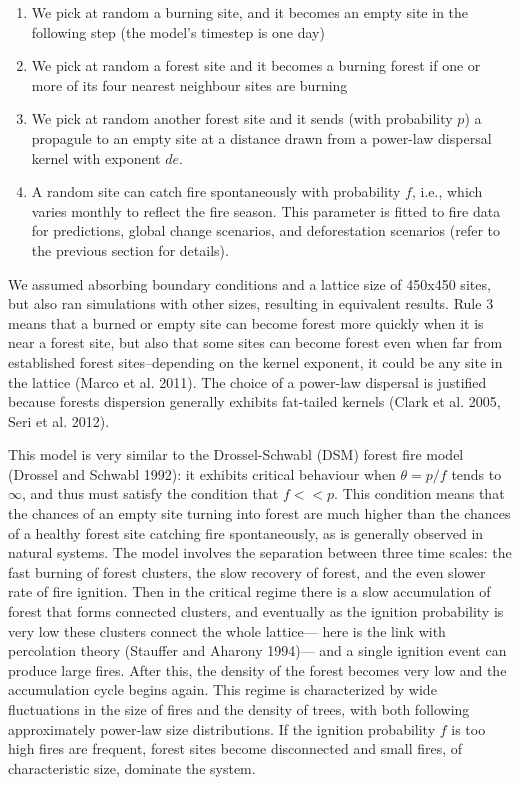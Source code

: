 \documentclass[
]{article}
\begin{document}
\begin{enumerate}
\def\labelenumi{\arabic{enumi}.}
\item
  We pick at random a burning site, and it becomes an empty site in the
  following step (the model's timestep is one day)
\item
  We pick at random a forest site and it becomes a burning forest if one
  or more of its four nearest neighbour sites are burning
\item
  We pick at random another forest site and it sends (with probability
  \(p\)) a propagule to an empty site at a distance drawn from a
  power-law dispersal kernel with exponent \(de\).
\item
  A random site can catch fire spontaneously with probability \(f\),
  i.e., which varies monthly to reflect the fire season. This parameter
  is fitted to fire data for predictions, global change scenarios, and
  deforestation scenarios (refer to the previous section for details).
\end{enumerate}

We assumed absorbing boundary conditions and a lattice size of 450x450
sites, but also ran simulations with other sizes, resulting in
equivalent results. Rule 3 means that a burned or empty site can become
forest more quickly when it is near a forest site, but also that some
sites can become forest even when far from established forest
sites--depending on the kernel exponent, it could be any site in the
lattice (Marco et al. 2011). The choice of a power-law dispersal is
justified because forests dispersion generally exhibits fat-tailed
kernels (Clark et al. 2005, Seri et al. 2012).

This model is very similar to the Drossel-Schwabl (DSM) forest fire
model (Drossel and Schwabl 1992): it exhibits critical behaviour when
\(\theta = p/f\) tends to \(\infty\), and thus must satisfy the
condition that \(f << p\). This condition means that the chances of an
empty site turning into forest are much higher than the chances of a
healthy forest site catching fire spontaneously, as is generally
observed in natural systems. The model involves the separation between
three time scales: the fast burning of forest clusters, the slow
recovery of forest, and the even slower rate of fire ignition. Then in
the critical regime there is a slow accumulation of forest that forms
connected clusters, and eventually as the ignition probability is very
low these clusters connect the whole lattice--- here is the link with
percolation theory (Stauffer and Aharony 1994)--- and a single ignition
event can produce large fires. After this, the density of the forest
becomes very low and the accumulation cycle begins again. This regime is
characterized by wide fluctuations in the size of fires and the density
of trees, with both following approximately power-law size
distributions. If the ignition probability \(f\) is too high fires are
frequent, forest sites become disconnected and small fires, of
characteristic size, dominate the system.
\end{document}

